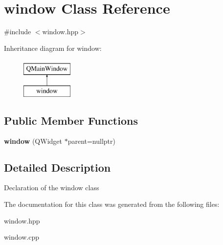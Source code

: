 \hypertarget{classwindow}{\section{window Class Reference}
\label{classwindow}
}


{\ttfamily \#include $<$window.\-hpp$>$}

Inheritance diagram for window\-:\begin{figure}[H]
\begin{center}
\leavevmode
\includegraphics[height=2.000000cm]{classwindow}
\end{center}
\end{figure}
\subsection*{Public Member Functions}
\begin{DoxyCompactItemize}
\item 
\hypertarget{classwindow_ace6edf1b8b23a3ef56469995f289c87f}{{\bfseries window} (Q\-Widget $\ast$parent=nullptr)}\label{classwindow_ace6edf1b8b23a3ef56469995f289c87f}

\end{DoxyCompactItemize}


\subsection{Detailed Description}
Declaration of the window class 

The documentation for this class was generated from the following files\-:\begin{DoxyCompactItemize}
\item 
window.\-hpp\item 
window.\-cpp\end{DoxyCompactItemize}
